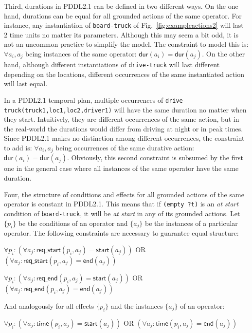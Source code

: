 \documentclass[runningheads]{llncs}
\newcommand{\dur}{\mathsf{dur}}    %
\newcommand{\start}{\mathsf{start}}%
\newcommand{\en}{\mathsf{end}}     %
\newcommand{\tim}{\mathsf{time}}   %
\newcommand{\reqs}{\mathsf{req\_{start}}} %
\newcommand{\reqe}{\mathsf{req\_{end}}}   %
\begin{document}


Third, durations in PDDL2.1 can be defined in two different ways. On the one hand, durations can be equal for all grounded actions of the same operator. For instance, any instantiation of \texttt{board-truck} of Fig.~\ref{fig:exampleactions2} will last 2 time units no matter its parameters. Although this may seem a bit odd, it is not an uncommon practice to simplify the model. The constraint to model this is: $\forall a_i,a_j$ being instances of the same operator: $\dur(a_i) = \dur(a_j)$. On the other hand, although different instantiations of \texttt{drive-truck} will last different depending on the locations, different occurrences of the same instantiated action will last equal.

In a PDDL2.1 temporal plan, multiple occurrences of \texttt{drive-truck(truck1,loc1,loc2,driver1)} will have the same duration no matter when they start. Intuitively, they are different occurrences of the same action, but in the real-world the durations would differ from driving at night or in peak times. Since PDDL2.1 makes no distinction among different occurrences, the constraint to add is: $\forall a_i,a_j$ being occurrences of the same durative action: $\dur(a_i) = \dur(a_j)$.
Obviously, this second constraint is subsumed by the first one in the general case where all instances of the same operator have the same duration.

Four, the structure of conditions and effects for all grounded actions of the same operator is constant in PDDL2.1. This means that if \texttt{(empty ?t)} is an \emph{at start} condition of \texttt{board-truck}, it will be \emph{at start} in any of its grounded actions.
Let $\{p_i\}$ be the conditions of an operator and $\{a_j\}$ be the instances of a particular operator. The following constraints are necessary to guarantee equal structure:

$\forall p_i: (\forall a_j: \reqs(p_i,a_j) = \start(a_j))$ OR $(\forall a_j: \reqs(p_i,a_j) = \en(a_j))$

$\forall p_i: (\forall a_j: \reqe(p_i,a_j) = \start(a_j))$ OR $(\forall a_j: \reqe(p_i,a_j) = \en(a_j))$

And analogously for all effects $\{p_i\}$ and the instances $\{a_j\}$ of an operator:

$\forall p_i: (\forall a_j: \tim(p_i,a_j) = \start(a_j))$ OR $(\forall a_j: \tim(p_i,a_j) = \en(a_j))$
\end{document}
